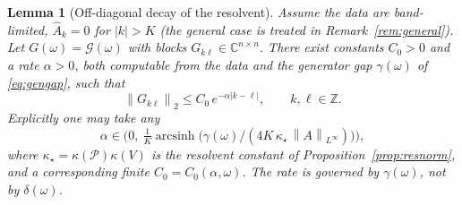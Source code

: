 \documentclass{amsart}
\newtheorem{lemma}{Lemma}
\theoremstyle{definition}
\newcommand{\C}{\mathbb{C}}
\newcommand{\Z}{\mathbb{Z}}
\newcommand{\norm}[1]{\left\lVert#1\right\rVert}
\begin{document}
\begin{lemma}[Off-diagonal decay of the resolvent]\label{lem:decay}
Assume the data are \emph{band-limited}, $\hat A_k=0$ for $|k|>K$ (the general
case is treated in Remark~\ref{rem:general}). Let
$G(\omega)=\mathcal G(\omega)$ with blocks $G_{k\ell}\in\C^{n\times n}$. There
exist constants $C_0>0$ and a rate $\alpha>0$, both computable from the data
and the \emph{generator gap} $\gamma(\omega)$ of \eqref{eq:gengap}, such that
\begin{equation}\label{eq:decay}
\norm{G_{k\ell}}_2\le C_0\,e^{-\alpha|k-\ell|},\qquad k,\ell\in\Z .
\end{equation}
Explicitly one may take any
\begin{equation}\label{eq:alpharange}
\alpha\in\Big(0,\ \tfrac1K\operatorname{arcsinh}\!\big(\gamma(\omega)/(4K\,\kappa_\star\,\norm{A}_{L^\infty})\big)\Big),
\end{equation}
where $\kappa_\star=\kappa(\mathcal P)\kappa(V)$ is the resolvent constant of
Proposition~\ref{prop:resnorm}, and a corresponding finite $C_0=C_0(\alpha,\omega)$.
The rate is governed by $\gamma(\omega)$, \emph{not} by $\delta(\omega)$.
\end{lemma}
\end{document}
